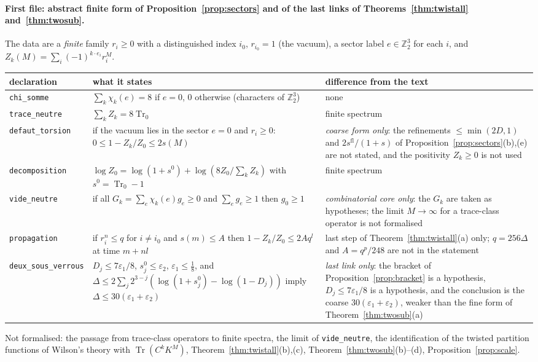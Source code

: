 \documentclass[11pt,a4paper]{article}
\theoremstyle{plain}
\theoremstyle{definition}
\theoremstyle{remark}
\numberwithin{equation}{section}
\newcommand{\Z}{\mathbb{Z}}
\newcommand{\Tr}{\operatorname{Tr}}
\begin{document}
\paragraph{First file: abstract finite form of Proposition~\ref{prop:sectors} and of the last links of Theorems~\ref{thm:twistall} and~\ref{thm:twosub}.} The data are a \emph{finite} family $r_i\ge0$ with a distinguished index $i_0$, $r_{i_0}=1$ (the vacuum), a sector label $e\in\Z_2^3$ for each $i$, and $Z_k(M)=\sum_i(-1)^{k\cdot e_i}r_i^M$.
\begin{center}\footnotesize
\begin{tabular}{@{}>{\raggedright\arraybackslash}p{}>{\raggedright\arraybackslash}p{}>{\raggedright\arraybackslash}p{}@{}}
\toprule
declaration & what it states & difference from the text\\
\midrule
\texttt{chi\_somme} & $\sum_k\chi_k(e)=8$ if $e=0$, $0$ otherwise (characters of $\Z_2^3$) & none\\
\texttt{trace\_neutre} & $\sum_kZ_k=8\Tr_0$ & finite spectrum\\
\texttt{defaut\_torsion} & if the vacuum lies in the sector $e=0$ and $r_i\ge0$: $0\le1-Z_k/Z_0\le2s(M)$ & \emph{coarse form only}: the refinements $\le\min(2D,1)$ and $2s^{\mathrm{fl}}/(1+s)$ of Proposition~\ref{prop:sectors}(b),(e) are not stated, and the positivity $Z_k\ge0$ is not used\\
\texttt{decomposition} & $\log Z_0=\log(1+s^0)+\log(8Z_0/\sum_kZ_k)$ with $s^0=\Tr_0-1$ & finite spectrum\\
\texttt{vide\_neutre} & if all $G_k=\sum_e\chi_k(e)g_e\ge0$ and $\sum_eg_e\ge1$ then $g_0\ge1$ & \emph{combinatorial core only}: the $G_k$ are taken as hypotheses; the limit $M\to\infty$ for a trace-class operator is not formalised\\
\texttt{propagation} & if $r_i^n\le q$ for $i\ne i_0$ and $s(m)\le A$ then $1-Z_k/Z_0\le2Aq^l$ at time $m+nl$ & last step of Theorem~\ref{thm:twistall}(a) only; $q=256\Delta$ and $A=q^p/248$ are not in the statement\\
\texttt{deux\_sous\_verrous} & $D_j\le7\varepsilon_1/8$, $s^0_j\le\varepsilon_2$, $\varepsilon_1\le\frac18$, and $\Delta\le2\sum_j2^{3-j}(\log(1+s^0_j)-\log(1-D_j))$ imply $\Delta\le30(\varepsilon_1+\varepsilon_2)$ & \emph{last link only}: the bracket of Proposition~\ref{prop:bracket} is a hypothesis, $D_j\le7\varepsilon_1/8$ is a hypothesis, and the conclusion is the coarse $30(\varepsilon_1+\varepsilon_2)$, weaker than the fine form of Theorem~\ref{thm:twosub}(a)\\
\bottomrule
\end{tabular}
\end{center}
Not formalised: the passage from trace-class operators to finite spectra, the limit of \texttt{vide\_neutre}, the identification of the twisted partition functions of Wilson's theory with $\Tr(C^kK^M)$, Theorem~\ref{thm:twistall}(b),(c), Theorem~\ref{thm:twosub}(b)--(d), Proposition~\ref{prop:scale}.
\end{document}
